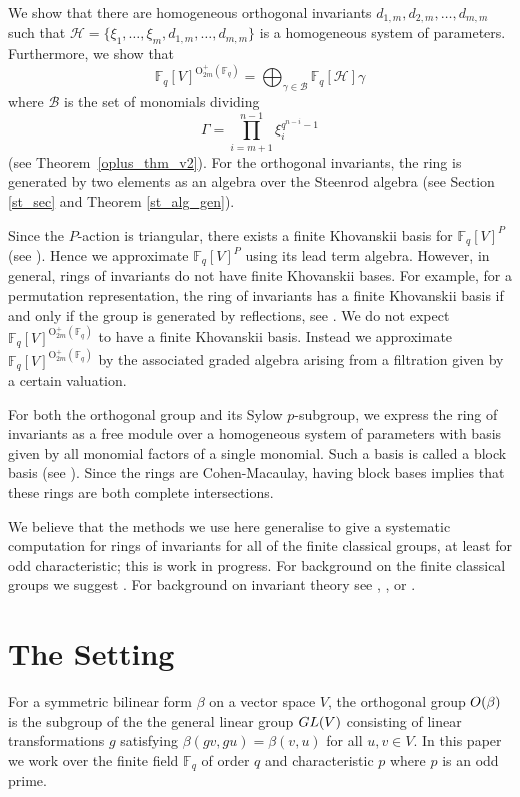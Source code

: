 \documentclass{amsart}
\newcommand{\field}{\mathbb{F}}
\newcommand{\orthp}[2]{{{\text{O}^{+}_{{#1}}(\field_{#2})}}}
\newcommand{\HH}{\mathcal{H}}
\newcommand{\B}{\mathcal{B}}
\begin{document}
We show that there are homogeneous orthogonal invariants 
$d_{1,m}, d_{2,m},\ldots,d_{m,m}$ such that
$\HH=\{\xi_1,\ldots,\xi_{m},d_{1,m},\ldots,d_{m,m}\}$
is a homogeneous system of parameters.   
Furthermore, we show that 
$$\field_{q}[V]^{\orthp{2m}{q}} = \bigoplus_{\gamma\in\B} \field_q[\HH]\gamma$$ 
where $\B$ is the set of monomials dividing 
$$\Gamma= \prod_{i=m+1}^{n-1}\xi_{i}^{q^{n-i}-1}$$
(see Theorem~\ref{oplus_thm_v2}).
For the orthogonal invariants, the ring is generated by two elements as 
an algebra over the Steenrod algebra (see Section \ref{st_sec} and 
Theorem \ref{st_alg_gen}).

Since the $P$-action is triangular,  there exists a finite Khovanskii basis for $\field_q[V]^{P}$ (see \cite{shank+wehlau-compmoduinva:02a}).  Hence we approximate $\field_q[V]^{P}$ using its lead term algebra.  However, in general, rings of invariants do not have finite Khovanskii bases.
For example, for a permutation representation, the ring of invariants has a finite 
Khovanskii basis if and only if the group is generated by reflections, see \cite{thiery+thomasse:04}.
We do not expect $\field_{q}[V]^{\orthp{2m}{q}}$ to have a finite Khovanskii basis.
Instead we approximate $\field_{q}[V]^{\orthp{2m}{q}}$ 
    by the associated graded algebra arising from a filtration given by a certain valuation.




    

For both the orthogonal group and its Sylow $p$-subgroup, we express the ring of invariants
as a free module over a homogeneous system of parameters with basis given by all monomial
factors of a single monomial.  Such a basis is called a block basis (see \cite{campbell+hughesetal-baseringcoin:96}).  
Since the rings are Cohen-Macaulay, having block
bases implies that these rings are both complete intersections. 

We believe that the methods we use here generalise to give a systematic computation for rings of invariants for all of the finite classical groups, at least for odd characteristic; this is work in progress. 
For background on the finite classical groups we suggest
\cite{taylor-classicalgroups:92}.
For background on invariant theory see 
\cite{benson-polyinvafinigrou:93},
\cite{Campbell+Wehlau:MIT11},
\cite{derksen+kemper-compinvatheo:02} or
\cite{Neusel+Smith-Invatheofinigrou:02}.

\section{The Setting}\label{setting_section}
For a symmetric bilinear form $\beta$ on a vector space $V$,
the orthogonal group ${\rm O}(\beta)$ is the subgroup of the the general linear group ${\rm GL}(V)$ consisting of linear transformations $g$
satisfying $\beta(gv,gu)=\beta(v,u)$ for all $u,v\in V$.
In this paper we work over the finite field $\field_q$
of order $q$ and characteristic $p$ where $p$ is an odd prime.
\end{document}
